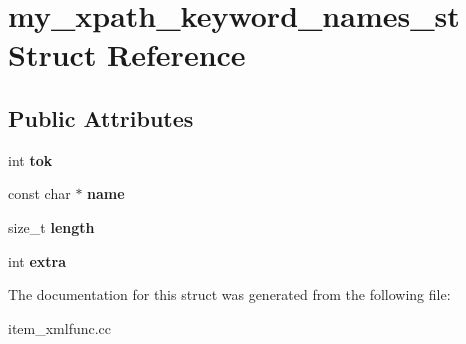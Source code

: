\hypertarget{structmy__xpath__keyword__names__st}{}\section{my\+\_\+xpath\+\_\+keyword\+\_\+names\+\_\+st Struct Reference}
\label{structmy__xpath__keyword__names__st}
\subsection*{Public Attributes}
\begin{DoxyCompactItemize}
\item 
\mbox{\label{structmy__xpath__keyword__names__st_a1d0271e6839703c20e6615c7536bc4d3}} 
int {\bfseries tok}
\item 
\mbox{\label{structmy__xpath__keyword__names__st_aabfba1c7c6be5970cf9e367aef8fa48f}} 
const char $\ast$ {\bfseries name}
\item 
\mbox{\label{structmy__xpath__keyword__names__st_a906aab3c4d949e074228d5200e095dfe}} 
size\+\_\+t {\bfseries length}
\item 
\mbox{\label{structmy__xpath__keyword__names__st_a8d6ad8c54f974553b493ffb278515c2a}} 
int {\bfseries extra}
\end{DoxyCompactItemize}


The documentation for this struct was generated from the following file\+:\begin{DoxyCompactItemize}
\item 
item\+\_\+xmlfunc.\+cc\end{DoxyCompactItemize}
